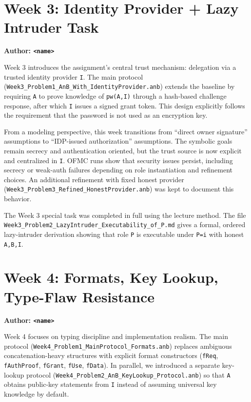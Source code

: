 \documentclass[11pt,a4paper]{article}
\begin{document}
\section{Week 3: Identity Provider + Lazy Intruder Task}
\textbf{Author: \texttt{<name>}}

Week 3 introduces the assignment's central trust mechanism: delegation via a trusted identity provider \texttt{I}.
The main protocol (\texttt{Week3\_Problem1\_AnB\_With\_IdentityProvider.anb}) extends the baseline by requiring \texttt{A} to prove knowledge of \texttt{pw(A,I)} through a hash-based challenge response, after which \texttt{I} issues a signed grant token.
This design explicitly follows the requirement that the password is not used as an encryption key.

From a modeling perspective, this week transitions from ``direct owner signature'' assumptions to ``IDP-issued authorization'' assumptions.
The symbolic goals remain secrecy and authentication oriented, but the trust source is now explicit and centralized in \texttt{I}.
OFMC runs show that security issues persist, including secrecy or weak-auth failures depending on role instantiation and refinement choices.
An additional refinement with fixed honest provider (\texttt{Week3\_Problem3\_Refined\_HonestProvider.anb}) was kept to document this behavior.

The Week 3 special task was completed in full using the lecture method.
The file \texttt{Week3\_Problem2\_LazyIntruder\_Executability\_of\_P.md} gives a formal, ordered lazy-intruder derivation showing that role \texttt{P} is executable under \texttt{P=i} with honest \texttt{A,B,I}.

\section{Week 4: Formats, Key Lookup, Type-Flaw Resistance}
\textbf{Author: \texttt{<name>}}

Week 4 focuses on typing discipline and implementation realism.
The main protocol (\texttt{Week4\_Problem1\_MainProtocol\_Formats.anb}) replaces ambiguous concatenation-heavy structures with explicit format constructors (\texttt{fReq}, \texttt{fAuthProof}, \texttt{fGrant}, \texttt{fUse}, \texttt{fData}).
In parallel, we introduced a separate key-lookup protocol (\texttt{Week4\_Problem2\_AnB\_KeyLookup\_Protocol.anb}) so that \texttt{A} obtains public-key statements from \texttt{I} instead of assuming universal key knowledge by default.
\end{document}
